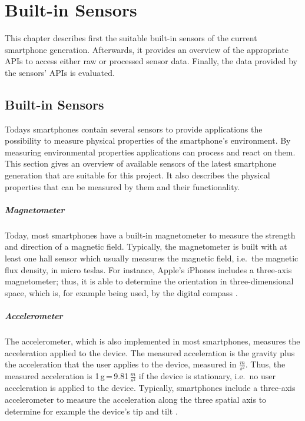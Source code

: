 \chapter{Built-in Sensors} \label{chap:sensors}

This chapter describes first the suitable built-in sensors of the current smartphone generation. Afterwards, it provides an overview of the appropriate \acsp{API} to access either raw or processed sensor data. Finally, the data provided by the sensors' \acsp{API} is evaluated.


\section{Built-in Sensors}
Todays smartphones contain several sensors to provide applications the possibility to measure physical properties of the smartphone's environment. By measuring environmental properties applications can process and react on them. This section gives an overview of available sensors of the latest smartphone generation that are suitable for this project. It also describes the physical properties that can be measured by them and their functionality.


\paragraph{Magnetometer}
Today, most smartphones have a built-in magnetometer to measure the strength and direction of a magnetic field. Typically, the magnetometer is built with at least one hall sensor which usually measures the magnetic field, i.e.\ the magnetic flux density, in micro teslas. For instance, Apple's iPhones includes a three-axis magnetometer; thus, it is able to determine the orientation in three-dimensional space, which is, for example being used, by the digital compass \citep{apple:wwdc_2012_pham,apple:ios_doc_cm}.


\paragraph{Accelerometer}
The accelerometer, which is also implemented in most smartphones, measures the acceleration applied to the device. The measured acceleration is the gravity plus the acceleration that the user applies to the device, measured in $\frac{m}{s^2}$. Thus, the measured acceleration is 1\,g\,=\,9.81\,$\frac{m}{s^2}$ if the device is stationary, i.e.\ no user acceleration is applied to the device. Typically, smartphones include a three-axis accelerometer to measure the acceleration along the three spatial axis to determine for example the device's tip and tilt \citep{apple:wwdc_2012_pham,apple:ios_doc_cm}.


